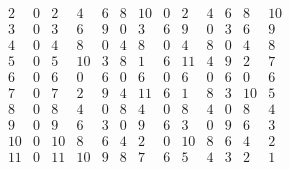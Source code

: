 \begin{exercise}[Shifrin 1.4.1]
\begin{equation}
\begin{array}{c|cccccccccccc}
        2 & 0 & 2 & 4 & 6 & 8 & 10 & 0 & 2 & 4 & 6 & 8 & 10 \\
        3 & 0 & 3 & 6 & 9 & 0 & 3 & 6 & 9 & 0 & 3 & 6 & 9 \\
        4 & 0 & 4 & 8 & 0 & 4 & 8 & 0 & 4 & 8 & 0 & 4 & 8 \\
        5 & 0 & 5 & 10 & 3 & 8 & 1 & 6 & 11 & 4 & 9 & 2 & 7 \\
        6 & 0 & 6 & 0 & 6 & 0 & 6 & 0 & 6 & 0 & 6 & 0 & 6 \\
        7 & 0 & 7 & 2 & 9 & 4 & 11 & 6 & 1 & 8 & 3 & 10 & 5 \\
        8 & 0 & 8 & 4 & 0 & 8 & 4 & 0 & 8 & 4 & 0 & 8 & 4 \\
        9 & 0 & 9 & 6 & 3 & 0 & 9 & 6 & 3 & 0 & 9 & 6 & 3 \\
        10 & 0 & 10 & 8 & 6 & 4 & 2 & 0 & 10 & 8 & 6 & 4 & 2 \\
        11 & 0 & 11 & 10 & 9 & 8 & 7 & 6 & 5 & 4 & 3 & 2 & 1
      \end{array} 
    \end{equation}
  \end{exercise}

